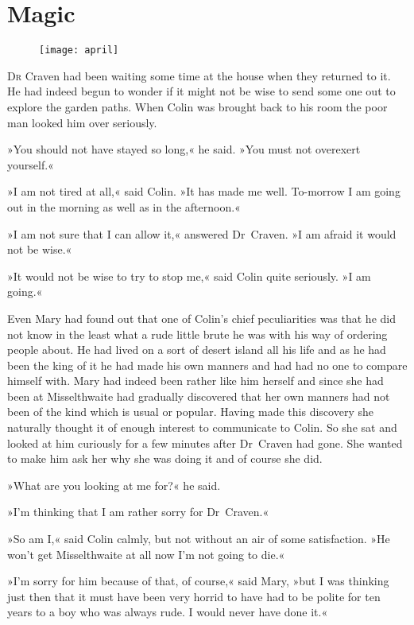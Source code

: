 \chapter{Magic} 
	
\begin{figure}[t!]
\centering
\texttt{[image: april]}
\end{figure}

	\lettrine[lines=6]{D}{r} Craven had been waiting some time at the house when they returned to it. He had indeed begun to wonder if it might not be wise to send some one out to explore the garden paths. When Colin was brought back to his room the poor man looked him over seriously.

\zz
»You should not have stayed so long,« he said. »You must not overexert yourself.«

»I am not tired at all,« said Colin. »It has made me well. To-morrow I am going out in the morning as well as in the afternoon.«

»I am not sure that I can allow it,« answered Dr~Craven. »I am afraid it would not be wise.«

»It would not be wise to try to stop me,« said Colin quite seriously. »I am going.«

Even Mary had found out that one of Colin's chief peculiarities was that he did not know in the least what a rude little brute he was with his way of ordering people about. He had lived on a sort of desert island all his life and as he had been the king of it he had made his own manners and had had no one to compare himself with. Mary had indeed been rather like him herself and since she had been at Misselthwaite had gradually discovered that her own manners had not been of the kind which is usual or popular. Having made this discovery she naturally thought it of enough interest to communicate to Colin. So she sat and looked at him curiously for a few minutes after Dr~Craven had gone. She wanted to make him ask her why she was doing it and of course she did.

»What are you looking at me for?« he said.

»I'm thinking that I am rather sorry for Dr~Craven.«

»So am I,« said Colin calmly, but not without an air of some satisfaction. »He won't get Misselthwaite at all now I'm not going to die.«

»I'm sorry for him because of that, of course,« said Mary, »but I was thinking just then that it must have been very horrid to have had to be polite for ten years to a boy who was always rude. I would never have done it.«

